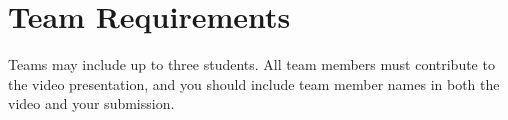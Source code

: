 \documentclass[11pt]{article}
\begin{document}
\section*{Team Requirements}

Teams may include up to three students. All team members must contribute to the video presentation, and you should include team member names in both the video and your submission.

%

%
\end{document}
